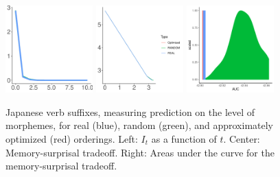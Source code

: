 \documentclass[11pt,letterpaper]{article}
\begin{document}
\begin{figure}
	\begin{center}
		\includegraphics[width=0.3\textwidth]{../code/ngram-control/create_models_ngrams/morph/Japanese/tradeoffs/figures/Japanese-suffixes-byMorphemes-it.pdf}
		\includegraphics[width=0.3\textwidth]{../code/ngram-control/create_models_ngrams/morph/Japanese/tradeoffs/figures/Japanese-suffixes-byMorphemes-memsurp.pdf}
		\includegraphics[width=0.3\textwidth]{../code/ngram-control/create_models_ngrams/morph/Japanese/tradeoffs/figures/Japanese-suffixes-byMorphemes-auc-hist.pdf}
\end{center}
	\caption{Japanese verb suffixes, measuring prediction on the level of morphemes, for real (blue), random (green), and approximately optimized (red) orderings. Left: $I_t$ as a function of $t$. Center: Memory-surprisal tradeoff. Right: Areas under the curve for the memory-surprisal tradeoff.}\label{fig:jap-morph}
\end{figure}
\end{document}
